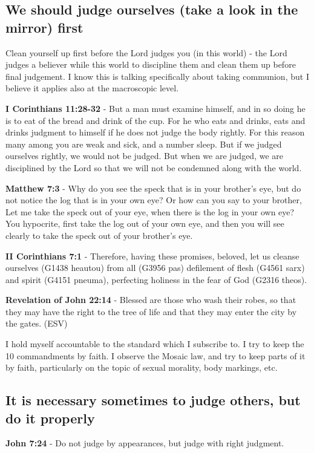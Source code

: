 \documentclass[11pt]{article}
\begin{document}
\subsection{We should judge ourselves (take a look in the mirror) first}
\label{sec:org570fa27}
Clean yourself up first before the Lord judges you (in this world) - the Lord judges a believer while this world to discipline them and clean them up before final judgement.
I know this is talking specifically about taking communion, but I believe it applies also at the macroscopic level.

\textbf{I Corinthians 11:28-32} - But a man must examine himself, and in so doing he is to eat of the bread and drink of the cup.  For he who eats and drinks, eats and drinks judgment to himself if he does not judge the body rightly.  For this reason many among you are weak and sick, and a number sleep.  But if we judged ourselves rightly, we would not be judged.  But when we are judged, we are disciplined by the Lord so that we will not be condemned along with the world.

\textbf{Matthew 7:3} - Why do you see the speck that is in your brother's eye, but do not notice the log that is in your own eye?  Or how can you say to your brother, Let me take the speck out of your eye, when there is the log in your own eye?  You hypocrite, first take the log out of your own eye, and then you will see clearly to take the speck out of your brother's eye.

\textbf{II Corinthians 7:1} - Therefore, having these promises, beloved, let us cleanse ourselves (G1438 heautou) from all (G3956 pas) defilement of flesh (G4561 sarx) and spirit (G4151 pneuma), perfecting holiness in the fear of God (G2316 theos).

\textbf{Revelation of John 22:14} - Blessed are those who wash their robes, so that they may have the right to the tree of life and that they may enter the city by the gates. (ESV)

I hold myself accountable to the standard which I subscribe to.
I try to keep the 10 commandments by faith.
I observe the Mosaic law, and try to keep parts of it by faith, particularly
on the topic of sexual morality, body markings, etc.

\subsection{It is necessary sometimes to judge others, but do it properly}
\label{sec:org538f805}
\textbf{John 7:24} - Do not judge by appearances, but judge with right judgment.
\end{document}
